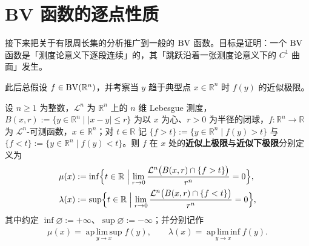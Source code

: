 \documentclass[../../main.tex]{subfiles}%
\begin{document}
\section{BV 函数的逐点性质}\label{section:ch05-09}

接下来把关于有限周长集的分析推广到一般的 $\mathrm{BV}$ 函数。目标是证明：一个 $\mathrm{BV}$ 函数是「测度论意义下逐段连续」的，其「跳跃沿着一张测度论意义下的 $C^1$ 曲面」发生。

此后总假设 $f\in\mathrm{BV}(\mathbb{R}^n)$，并考察当 $y$ 趋于典型点 $x\in\mathbb{R}^n$ 时 $f(y)$ 的近似极限。

\begin{definition}[近似上极限与近似下极限]\label{definition:ch05-5-8}
设 $n\geqslant1$ 为整数，$\mathcal{L}^n$ 为 $\mathbb{R}^n$ 上的 $n$ 维 Lebesgue 测度，$B(x,r):=\{y\in\mathbb{R}^n\mid\lvert x-y\rvert\leqslant r\}$ 为以 $x$ 为心、$r>0$ 为半径的闭球，$f:\mathbb{R}^n\to\mathbb{R}$ 为 $\mathcal{L}^n$-可测函数，$x\in\mathbb{R}^n$；对 $t\in\mathbb{R}$ 记 $\{f>t\}:=\{y\in\mathbb{R}^n\mid f(y)>t\}$ 与 $\{f<t\}:=\{y\in\mathbb{R}^n\mid f(y)<t\}$。则 $f$ 在 $x$ 处的\textbf{近似上极限}与\textbf{近似下极限}分别定义为
\begin{align*}
\mu(x)&:=\inf\Bigl\{t\in\mathbb{R}\Bigm|\lim_{r\to0}\frac{\mathcal{L}^n\bigl(B(x,r)\cap\{f>t\}\bigr)}{r^n}=0\Bigr\},\\
\lambda(x)&:=\sup\Bigl\{t\in\mathbb{R}\Bigm|\lim_{r\to0}\frac{\mathcal{L}^n\bigl(B(x,r)\cap\{f<t\}\bigr)}{r^n}=0\Bigr\},
\end{align*}
其中约定 $\inf\varnothing:=+\infty$、$\sup\varnothing:=-\infty$；并分别记作
\begin{align*}
\mu(x)=\operatorname*{ap\,lim\,sup}_{y\to x}f(y),\qquad
\lambda(x)=\operatorname*{ap\,lim\,inf}_{y\to x}f(y).
\end{align*}
\end{definition}
\end{document}
